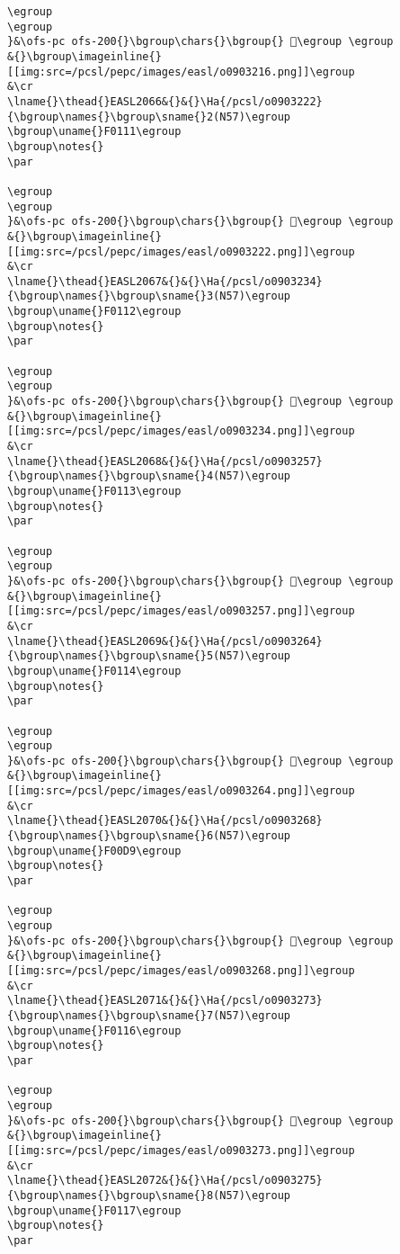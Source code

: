 \begin{verbatim}
\egroup
\egroup
}&\ofs-pc ofs-200{}\bgroup\chars{}\bgroup{} 󲰦\egroup \egroup
&{}\bgroup\imageinline{}[[img:src=/pcsl/pepc/images/easl/o0903216.png]]\egroup
&\cr
\lname{}\thead{}EASL2066&{}&{}\Ha{/pcsl/o0903222}{\bgroup\names{}\bgroup\sname{}2(N57)\egroup
\bgroup\uname{}F0111\egroup
\bgroup\notes{}
\par 

\egroup
\egroup
}&\ofs-pc ofs-200{}\bgroup\chars{}\bgroup{} 󰄑\egroup \egroup
&{}\bgroup\imageinline{}[[img:src=/pcsl/pepc/images/easl/o0903222.png]]\egroup
&\cr
\lname{}\thead{}EASL2067&{}&{}\Ha{/pcsl/o0903234}{\bgroup\names{}\bgroup\sname{}3(N57)\egroup
\bgroup\uname{}F0112\egroup
\bgroup\notes{}
\par 

\egroup
\egroup
}&\ofs-pc ofs-200{}\bgroup\chars{}\bgroup{} 󰄒\egroup \egroup
&{}\bgroup\imageinline{}[[img:src=/pcsl/pepc/images/easl/o0903234.png]]\egroup
&\cr
\lname{}\thead{}EASL2068&{}&{}\Ha{/pcsl/o0903257}{\bgroup\names{}\bgroup\sname{}4(N57)\egroup
\bgroup\uname{}F0113\egroup
\bgroup\notes{}
\par 

\egroup
\egroup
}&\ofs-pc ofs-200{}\bgroup\chars{}\bgroup{} 󰄓\egroup \egroup
&{}\bgroup\imageinline{}[[img:src=/pcsl/pepc/images/easl/o0903257.png]]\egroup
&\cr
\lname{}\thead{}EASL2069&{}&{}\Ha{/pcsl/o0903264}{\bgroup\names{}\bgroup\sname{}5(N57)\egroup
\bgroup\uname{}F0114\egroup
\bgroup\notes{}
\par 

\egroup
\egroup
}&\ofs-pc ofs-200{}\bgroup\chars{}\bgroup{} 󰄔\egroup \egroup
&{}\bgroup\imageinline{}[[img:src=/pcsl/pepc/images/easl/o0903264.png]]\egroup
&\cr
\lname{}\thead{}EASL2070&{}&{}\Ha{/pcsl/o0903268}{\bgroup\names{}\bgroup\sname{}6(N57)\egroup
\bgroup\uname{}F00D9\egroup
\bgroup\notes{}
\par 

\egroup
\egroup
}&\ofs-pc ofs-200{}\bgroup\chars{}\bgroup{} 󰃙\egroup \egroup
&{}\bgroup\imageinline{}[[img:src=/pcsl/pepc/images/easl/o0903268.png]]\egroup
&\cr
\lname{}\thead{}EASL2071&{}&{}\Ha{/pcsl/o0903273}{\bgroup\names{}\bgroup\sname{}7(N57)\egroup
\bgroup\uname{}F0116\egroup
\bgroup\notes{}
\par 

\egroup
\egroup
}&\ofs-pc ofs-200{}\bgroup\chars{}\bgroup{} 󰄖\egroup \egroup
&{}\bgroup\imageinline{}[[img:src=/pcsl/pepc/images/easl/o0903273.png]]\egroup
&\cr
\lname{}\thead{}EASL2072&{}&{}\Ha{/pcsl/o0903275}{\bgroup\names{}\bgroup\sname{}8(N57)\egroup
\bgroup\uname{}F0117\egroup
\bgroup\notes{}
\par 


\end{verbatim}
